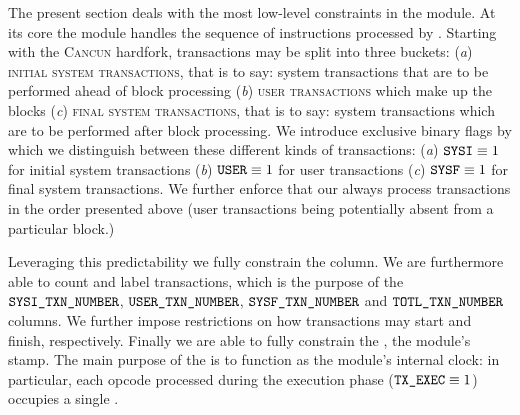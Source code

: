The present section deals with the most low-level constraints in the \hubMod{} module.
At its core the \hubMod{} module handles the sequence of instructions processed by \linea{}.
Starting with the \textsc{Cancun} hardfork, \evm{} transactions may be split into three buckets:
(\emph{a}) \textsc{initial system transactions}, that is to say: system transactions that are to be performed ahead of block processing
(\emph{b}) \textsc{user transactions} which make up the blocks
(\emph{c}) \textsc{final system transactions}, that is to say: system transactions which are to be performed after block processing.
We introduce exclusive binary flags by which we distinguish between these different kinds of transactions:
(\emph{a}) $\texttt{SYSI} \equiv 1$ for initial system transactions
(\emph{b}) $\texttt{USER} \equiv 1$ for user transactions
(\emph{c}) $\texttt{SYSF} \equiv 1$ for final system transactions.
We further enforce that our \zkEvm{} always process transactions in the order presented above
(user transactions being potentially absent from a particular block.)

Leveraging this predictability we fully constrain the \blockNumber{} column.
We are furthermore able to count and label transactions,
which is the purpose of the
$\texttt{SYSI}\texttt{\_}\texttt{TXN\_NUMBER}$,
$\texttt{USER}\texttt{\_}\texttt{TXN\_NUMBER}$,
$\texttt{SYSF}\texttt{\_}\texttt{TXN\_NUMBER}$ and
$\texttt{TOTL}\texttt{\_}\texttt{TXN\_NUMBER}$
columns.
We further impose restrictions on how transactions may start and finish, respectively.
Finally we are able to fully constrain the \hubStamp{}, the \hubMod{} module's stamp.
The main purpose of the \hubStamp{} is to function as the \hubMod{} module's internal clock:
in particular, each opcode processed during the execution phase ($\texttt{TX}\texttt{\_EXEC} \equiv 1$) occupies a single \hubStamp{}.
